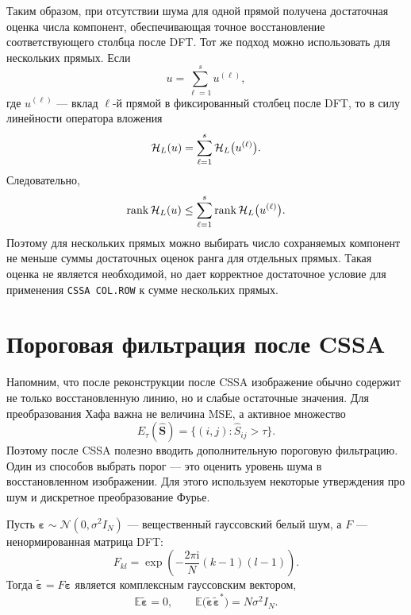 Таким образом, при отсутствии шума для одной прямой получена достаточная оценка
числа компонент, обеспечивающая точное восстановление соответствующего
столбца после DFT. Тот же подход можно использовать для нескольких прямых. Если
\[
    u=\sum_{\ell=1}^{s} u^{(\ell)},
\]
где $u^{(\ell)}$ --- вклад $\ell$-й прямой в фиксированный столбец после DFT, то в
силу линейности оператора вложения
\[
    \mathcal H_L(u)
    =
    \sum_{\ell=1}^{s}\mathcal H_L\bigl(u^{(\ell)}\bigr).
\]
Следовательно,
\[
    \operatorname{rank}\mathcal H_L(u)
    \le
    \sum_{\ell=1}^{s}
    \operatorname{rank}\mathcal H_L\bigl(u^{(\ell)}\bigr).
\]
Поэтому для нескольких прямых можно выбирать число сохраняемых компонент не
меньше суммы достаточных оценок ранга для отдельных прямых. Такая оценка не
является необходимой, но дает корректное достаточное условие для применения
\texttt{CSSA COL.ROW} к сумме нескольких прямых.

\section{Пороговая фильтрация после CSSA}

Напомним, что после реконструкции после CSSA изображение обычно содержит не только
восстановленную линию, но и слабые остаточные значения. Для преобразования Хафа важна не
величина MSE, а активное множество
\[
E_{\tau}(\widehat{\mathbf{S}})
=
\{(i,j):\widehat S_{ij}>\tau\}.
\]
Поэтому после CSSA полезно вводить дополнительную пороговую фильтрацию. Один
из способов выбрать порог --- это оценить уровень шума в восстановленном
изображении. Для этого используем некоторые утверждения про шум и дискретное
преобразование Фурье.

\begin{statement}
Пусть $\boldsymbol{\varepsilon}\sim\mathcal{N}(0,\sigma^2 I_N)$ --- вещественный
гауссовский белый шум, а $F$ --- ненормированная матрица DFT:
\[
F_{kl}
=
\exp\!\left(
-\frac{2\pi\mathrm{i}}{N}(k-1)(l-1)
\right).
\]
Тогда $\widetilde{\boldsymbol{\varepsilon}}=F\boldsymbol{\varepsilon}$ является
комплексным гауссовским вектором,
\[
\mathbb{E}\widetilde{\boldsymbol{\varepsilon}}=0,
\qquad
\mathbb{E}\bigl(
\widetilde{\boldsymbol{\varepsilon}}
\widetilde{\boldsymbol{\varepsilon}}^{*}
\bigr)
=
N\sigma^2 I_N.
\]
\end{statement}

